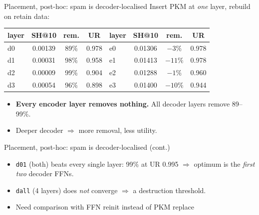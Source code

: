 \documentclass{beamer}
\begin{document}
\begin{frame}{Placement, post-hoc: spam is decoder-localised}
Insert PKM at \emph{one} layer, rebuild on retain data:
\begin{center}
\begin{tabular}{|l|c|c|c||l|c|c|c|}
\hline
layer & SH@10 & rem. & UR & layer & SH@10 & rem. & UR \\
\hline
d0 & 0.00139 & 89\% & 0.978 & e0 & 0.01306 & $-3\%$  & 0.978 \\
d1 & 0.00031 & 98\% & 0.958 & e1 & 0.01413 & $-11\%$ & 0.978 \\
d2 & 0.00009 & 99\% & 0.904 & e2 & 0.01288 & $-1\%$  & 0.960 \\
d3 & 0.00054 & 96\% & 0.898 & e3 & 0.01400 & $-10\%$ & 0.944 \\
\hline
\end{tabular}
\end{center}

\begin{itemize}
  \item \textbf{Every encoder layer removes nothing.} All decoder layers remove
        89--99\%.
  \item Deeper decoder $\Rightarrow$ more removal, less utility.
\end{itemize}
\end{frame}

\begin{frame}{Placement, post-hoc: spam is decoder-localised (cont.)}
\begin{itemize}
  \item \texttt{d01} (both) beats every single layer: 99\% at UR 0.995
        $\Rightarrow$ optimum is the \emph{first two} decoder FFNs.
  \item \texttt{dall} (4 layers) does \emph{not} converge $\Rightarrow$
        a destruction threshold.
  \item Need comparison with FFN reinit instead of PKM replace
\end{itemize}
\end{frame}
\end{document}
